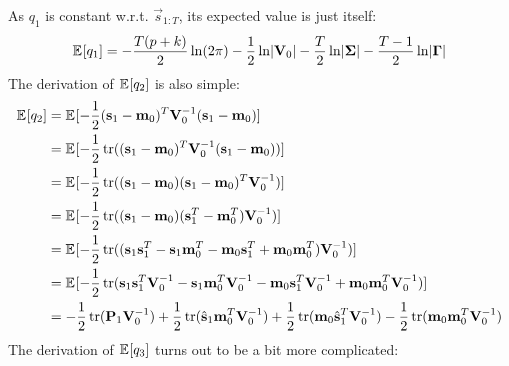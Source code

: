 		As \(q_1\) is constant w.r.t. \( \vec{s}_{1:T} \), its expected value is just itself:
		\begin{equation*}
			\mathbb{E}_{}[q_1] = -\frac{T (p + k)}{2} \ln (2\pi) - \frac{1}{2} \ln \lvert\boldsymbol{\mathrm{V}}_0\rvert - \frac{T}{2} \ln \lvert\boldsymbol{\mathrm{\Sigma}}\rvert - \frac{T - 1}{2} \ln \lvert\boldsymbol{\mathrm{\Gamma}}\rvert
		\end{equation*}
		The derivation of \( \mathbb{E}_{}[q_2] \) is also simple:
		\begin{align*}
			\E{q_2}
				&= \E{-\frac{1}{2} \paren{\vec{s}_1 - \vec{m}_0}^T \mat{V}_0^{-1} \paren{\vec{s}_1 - \vec{m}_0}} \\
				&= \E{-\frac{1}{2} \tr\paren{ \paren{\vec{s}_1 - \vec{m}_0}^T \mat{V}_0^{-1} \paren{\vec{s}_1 - \vec{m}_0} }} \\
				&= \E{-\frac{1}{2} \tr\paren{ \paren{\vec{s}_1 - \vec{m}_0} \paren{\vec{s}_1 - \vec{m}_0}^T \mat{V}_0^{-1} }} \\
				&= \E{-\frac{1}{2} \tr\paren{ \paren{\vec{s}_1 - \vec{m}_0} \paren{\vec{s}_1^T - \vec{m}_0^T} \mat{V}_0^{-1} }} \\
				&= \E{-\frac{1}{2} \tr\paren{ \paren{\vec{s}_1 \vec{s}_1^T - \vec{s}_1 \vec{m}_0^T - \vec{m}_0 \vec{s}_1^T + \vec{m}_0 \vec{m}_0^T} \mat{V}_0^{-1} }} \\
				&= \E{-\frac{1}{2} \tr\paren{ \vec{s}_1 \vec{s}_1^T \mat{V}_0^{-1} - \vec{s}_1 \vec{m}_0^T \mat{V}_0^{-1} - \vec{m}_0 \vec{s}_1^T \mat{V}_0^{-1} + \vec{m}_0 \vec{m}_0^T \mat{V}_0^{-1} }} \\
				&= -\frac{1}{2} \tr\paren{\mat{P}_1 \mat{V}_0^{-1}} + \frac{1}{2} \tr\paren{\hat{\vec{s}}_1 \vec{m}_0^T \mat{V}_0^{-1}} + \frac{1}{2} \tr\paren{\vec{m}_0 \hat{\vec{s}}_1^T \mat{V}_0^{-1}} - \frac{1}{2} \tr\paren{\vec{m}_0 \vec{m}_0^T \mat{V}_0^{-1}}
		\end{align*}
		The derivation of \( \mathbb{E}_{}[q_3] \) turns out to be a bit more complicated:
